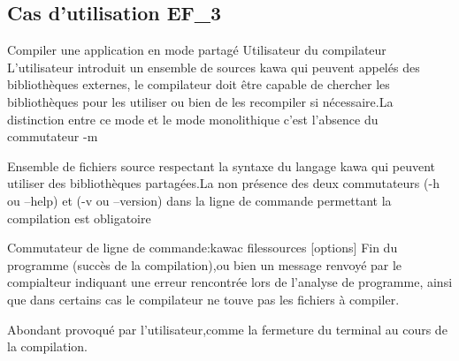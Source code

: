 \subsection{Cas d'utilisation EF\_3}
\fiche
{Compiler une application en mode partagé}                    %
{Utilisateur du compilateur}                               %
{                                                %
  L’utilisateur introduit un ensemble de sources kawa
 qui peuvent appelés des bibliothèques externes, le compilateur doit être capable de chercher les bibliothèques pour les utiliser ou bien  de les recompiler si nécessaire.La distinction entre ce mode et le mode monolithique c'est l'absence du commutateur -m 
}
{
	Ensemble de fichiers source respectant la syntaxe du langage kawa qui peuvent utiliser des bibliothèques partagées.La non présence des deux commutateurs (-h ou --help) et (-v ou --version) dans la ligne de commande permettant la compilation est obligatoire
	
}                                                %
{Commutateur de ligne de commande:kawac filessources [options]}                             %
{Fin du programme (succès de la compilation),ou bien un message renvoyé par le compialteur indiquant une erreur rencontrée lors de l'analyse de programme, ainsi que dans certains cas le compilateur ne touve pas les fichiers à compiler.} %
{                                                %
  
}{} %
{Abondant provoqué par l'utilisateur,comme la fermeture du terminal au cours de la compilation.} %


